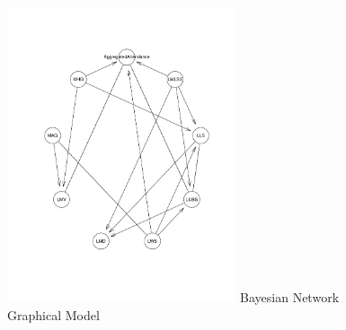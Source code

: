\documentclass[inte,blindrev]{informs3}
\begin{document}
\begin{figure}
\FIGURE
{\includegraphics[height = 0.5\textheight, width = 0.6\textwidth]{Figure6}}
{Bayesian Network Graphical Model\label{Bayes}}
{}
\end{figure}

%
%
%




\end{document}
